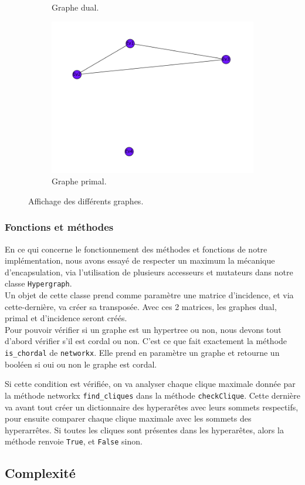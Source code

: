 \documentclass[a4papper]{article}
\begin{document}
\begin{figure}[h!]
\begin{subfigure}[b]{0.45\linewidth}
  		\caption{Graphe dual.}
  	\end{subfigure}
  	\begin{subfigure}[b]{0.5\linewidth}
		\includegraphics[width=\linewidth]{graphe_primal.png}
  		\caption{Graphe primal.}
  	\end{subfigure}
  	\caption{Affichage des différents graphes.}
\end{figure}

		\subsubsection{Fonctions et méthodes}
			En ce qui concerne le fonctionnement des méthodes et fonctions de notre implémentation, nous avons essayé de respecter un maximum la mécanique d'encapsulation, via l'utilisation de plusieurs accesseurs et mutateurs dans notre classe \texttt{Hypergraph}.\\
			
			Un objet de cette classe prend comme paramètre une matrice d'incidence, et via cette-dernière, va créer sa transposée. Avec ces 2 matrices, les graphes dual, primal et d'incidence seront créés.\\
			
			Pour pouvoir vérifier si un graphe est un hypertree ou non, nous devons tout d'abord vérifier s'il est cordal ou non. C'est ce que fait exactement la méthode \texttt{is\_chordal} de \texttt{networkx}. Elle prend en paramètre un graphe et retourne un booléen si oui ou non le graphe est cordal. 
			
			Si cette condition est vérifiée, on va analyser chaque clique maximale donnée par la méthode networkx \texttt{find\_cliques} dans la méthode \texttt{checkClique}. Cette dernière va avant tout créer un dictionnaire des hyperarêtes avec leurs sommets respectifs, pour ensuite comparer chaque clique maximale avec les sommets des hyperarrêtes. Si toutes les cliques sont présentes dans les hyperarêtes, alors la méthode renvoie \texttt{True}, et \texttt{False} sinon.
			

	\subsection{Complexité}	
			


\newpage
\tableofcontents
\end{document}
